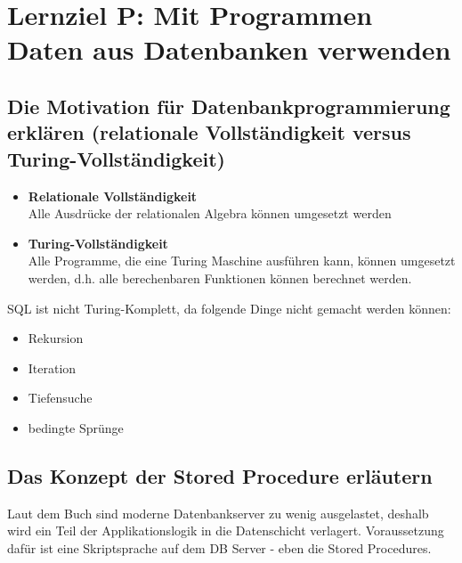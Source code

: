 \section{Lernziel P: Mit Programmen Daten aus Datenbanken verwenden}

\subsection{Die Motivation für Datenbankprogrammierung erklären (relationale Vollständigkeit versus Turing-Vollständigkeit)}

\begin{itemize}
    \item \textbf{Relationale Vollständigkeit} \\
    Alle Ausdrücke der relationalen Algebra können umgesetzt werden
    \item \textbf{Turing-Vollständigkeit} \\
    Alle Programme, die eine Turing Maschine ausführen kann, können umgesetzt werden, d.h. alle berechenbaren Funktionen können berechnet werden.
\end{itemize}

SQL ist nicht Turing-Komplett, da folgende Dinge nicht gemacht werden können:

\begin{itemize}
    \item Rekursion
    \item Iteration
    \item Tiefensuche
    \item bedingte Sprünge
\end{itemize}

\subsection{Das Konzept der Stored Procedure erläutern}

Laut dem Buch sind moderne Datenbankserver zu wenig ausgelastet, deshalb wird ein Teil der Applikationslogik in die Datenschicht verlagert. Voraussetzung dafür ist eine Skriptsprache auf dem DB Server - eben die Stored Procedures.

